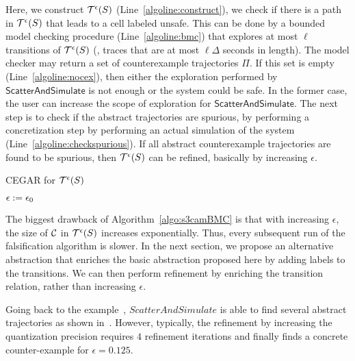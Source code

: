 Here, we construct $\mathcal{T}^{\epsilon}(S)$
(Line~\ref{algoline:construct}), we check if there is a path in
$\mathcal{T}^{\epsilon}(S)$ that leads to a cell labeled
unsafe. This can be done by a bounded model checking procedure
(Line~\ref{algoline:bmc}) that explores at most $\ell$ transitions of
$\mathcal{T}^{\epsilon}(S)$ (\ie, traces that are at most
$\ell\Delta$ seconds in length). The model checker may return a set of
counterexample trajectories $\Pi$. If this set is empty
(Line~\ref{algoline:nocex}), then either the exploration performed by
$\mathsf{ScatterAndSimulate}$ is not enough or the system could be
safe. In the former case, the user can increase the scope of
exploration for $\mathsf{ScatterAndSimulate}$.  The next step is to
check if the abstract trajectories are spurious, by performing a
concretization step by performing an actual simulation of the system
(Line~\ref{algoline:checkspurious}). If all abstract counterexample
trajectories are found to be spurious, then
$\mathcal{T}^{\epsilon}(S)$ can be refined, basically by
increasing $\epsilon$.
\begin{algorithm}[t]
\DontPrintSemicolon
\caption{CEGAR for $\mathcal{T}^{\epsilon}(S)$\label{algo:s3camBMC}}
$\epsilon := \epsilon_0$ \;
\end{algorithm}

The biggest drawback of Algorithm~\ref{algo:s3camBMC} is that with
increasing $\epsilon$, the size of $\mathcal{C}$ in
$\mathcal{T}^{\epsilon}(S)$ increases exponentially.  Thus,
every subsequent run of the falsification algorithm is slower. In the
next section, we propose an alternative abstraction that enriches the
basic abstraction proposed here by adding labels to the transitions.
We can then perform refinement by enriching the transition relation,
rather than increasing $\epsilon$.

\begin{example}

Going back to the example~, $ScatterAndSimulate$ is able to
    find several abstract trajectories as shown
    in~. However, typically, the refinement by
    increasing the quantization precision requires $4$ refinement
    iterations and finally finds a concrete counter-example for
    $\epsilon=0.125$.
\end{example}


